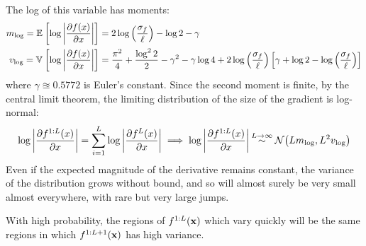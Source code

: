 \documentclass{article}
\begin{document}
The log of this variable has moments:
\begin{align}
m_{\log} = \mathbb{E}_{} \left[ {\log \left| \frac{\partial f(x)}{\partial x} \right|} \right] & = 2 \log \left( \frac{\sigma_f}{\ell} \right) - \log2 - \gamma \\
v_{\log} = \mathbb{V}_{} \left[ {\log \left| \frac{\partial f(x)}{\partial x} \right|} \right] & = \frac{\pi^2}{4} + \frac{\log^2 2}{2}  - \gamma^2 - \gamma \log4 + 2 \log\left(\frac{\sigma_f}{\ell}\right) \left[ \gamma + \log2 - \log \left(\frac{\sigma_f}{\ell}\right) \right] \nonumber
\end{align}
where $\gamma \approxeq 0.5772$ is Euler's constant.  Since the second moment is finite, by the central limit theorem, the limiting distribution of the size of the gradient is log-normal:
\begin{align}
\log \left| \frac{\partial f^{1:L}(x)}{\partial x} \right| 
 = \sum_{i=1}^L \log \left| \frac{\partial f^{L}(x)}{\partial x} \right| \implies
\log \left| \frac{\partial f^{1:L}(x)}{\partial x} \right| \distas{L \rightarrow \infty} \Nt{ L m_{\log} }{L^2 v_{\log}}
\end{align}
%
Even if the expected magnitude of the derivative remains constant, the variance of the distribution grows without bound, and so will almost surely be very small almost everywhere, with rare but very large jumps.


With high probability, the regions of $f^{1:L}({\bf{x}})$ which vary quickly will be the same regions in which $f^{1:L + 1}({\bf{x}})$  has high variance.


\end{document}
